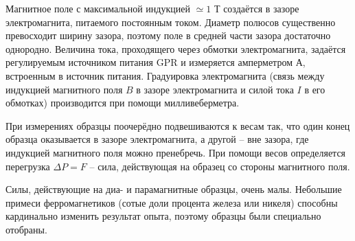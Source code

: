 \documentclass[a4paper]{article}
\begin{document}
Магнитное поле с максимальной индукцией $ \simeq 1 $ Т создаётся в зазоре электромагнита, питаемого постоянным током. Диаметр полюсов существенно превосходит ширину зазора, поэтому поле в средней части зазора достаточно однородно. Величина тока, проходящего через обмотки электромагнита, задаётся регулируемым источником питания GPR и измеряется амперметром $ А $, встроенным в источник питания. Градуировка электромагнита (связь между индукцией магнитного поля $ B $ в зазоре электромагнита и силой тока $ I $ в его обмотках) производится при помощи милливеберметра.


При измерениях образцы поочерёдно подвешиваются к весам так, что один конец образца оказывается в зазоре электромагнита, а другой -- вне зазора, где индукцией магнитного поля можно пренебречь. При помощи весов определяется перегрузка $ \Delta P = F $ -- сила, действующая на образец со стороны магнитного поля.


Силы, действующие на диа- и парамагнитные образцы, очень малы. Небольшие примеси ферромагнетиков (сотые доли процента железа или никеля) способны кардинально изменить результат опыта, поэтому образцы были специально отобраны.
\end{document}

